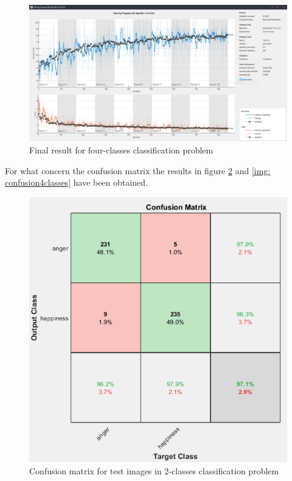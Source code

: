\documentclass[a4paper]{report}
\begin{document}
	\begin{figure}[htbp]
		\centering
		\includegraphics[scale=0.31]{img/trainingCnnFourClassesFinalResult.png}
		\caption{Final result for four-classes classification problem}
		\label{img: trainingCnnFourClassesFinalResult}
	\end{figure}

	\noindent For what concern the confusion matrix the results in figure \ref{img: confusion2classes} and \ref{img: confusion4classes} have been obtained.
	
	\begin{figure}[htbp]
		\centering
		\includegraphics[scale=0.7]{img/confusion_2class.png}
		\caption{Confusion matrix for test images in 2-classes classification problem}
		\label{img: confusion2classes}
	\end{figure}
\end{document}
